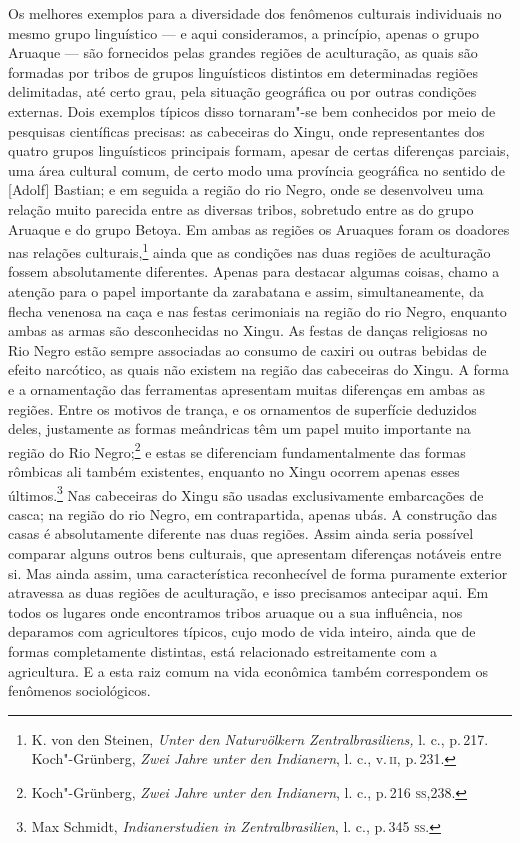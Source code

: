 Os melhores exemplos para a diversidade dos fenômenos culturais
individuais no mesmo grupo linguístico --- e aqui consideramos, a
princípio, apenas o grupo Aruaque --- são fornecidos pelas grandes
regiões de aculturação, as quais são formadas por tribos de grupos
linguísticos distintos em determinadas regiões delimitadas, até certo
grau, pela situação geográfica ou por outras condições externas. Dois
exemplos típicos disso tornaram"-se bem conhecidos por meio de pesquisas
científicas precisas: as cabeceiras do Xingu, onde representantes dos
quatro grupos linguísticos principais formam, apesar de certas
diferenças parciais, uma área cultural comum, de certo modo uma
província geográfica no sentido de {[}Adolf{]} Bastian; e em seguida a
região do rio Negro, onde se desenvolveu uma relação muito parecida
entre as diversas tribos, sobretudo entre as do grupo Aruaque e do grupo
Betoya. Em ambas as regiões os Aruaques foram os doadores nas relações
culturais,\footnote{K. von den Steinen, \textit{Unter den Naturvölkern
  Zentralbrasiliens,} l. c., p.\,217. Koch"-Grünberg, \textit{Zwei Jahre
  unter den Indianern}, l. c., v.\,\textsc{ii}, p.\,231.} ainda que as condições
nas duas regiões de aculturação fossem absolutamente diferentes.
Apenas para destacar algumas coisas, chamo a atenção para o papel
importante da zarabatana e assim, simultaneamente, da flecha venenosa na
caça e nas festas cerimoniais na região do rio Negro, enquanto ambas as
armas são desconhecidas no Xingu. As festas de danças religiosas no Rio
Negro estão sempre associadas ao consumo de caxiri ou outras bebidas de
efeito narcótico, as quais não existem na região das cabeceiras do
Xingu. A forma e a ornamentação das ferramentas apresentam muitas
diferenças em ambas as regiões. Entre os motivos de trança, e os
ornamentos de superfície deduzidos deles, justamente as formas
meândricas têm um papel muito importante na região do Rio
Negro;\footnote{Koch"-Grünberg, \textit{Zwei Jahre unter den Indianern}, l.
  c., p.\,216 \textsc{ss},238.} e estas se diferenciam fundamentalmente das
formas rômbicas ali também existentes, enquanto no Xingu ocorrem apenas
esses últimos.\footnote{Max Schmidt, \textit{Indianerstudien in
  Zentralbrasilien}, l. c., p.\,345 \textsc{ss}.} Nas cabeceiras do Xingu são
usadas exclusivamente embarcações de casca; na região do rio Negro, em
contrapartida, apenas ubás. A construção das casas é absolutamente
diferente nas duas regiões. Assim ainda seria possível comparar alguns
outros bens culturais, que apresentam diferenças notáveis entre si. Mas
ainda assim, uma característica reconhecível de forma puramente exterior
atravessa as duas regiões de aculturação, e isso precisamos antecipar
aqui. Em todos os lugares onde encontramos tribos aruaque ou a sua
influência, nos deparamos com agricultores típicos, cujo modo de vida
inteiro, ainda que de formas completamente distintas, está relacionado
estreitamente com a agricultura. E a esta raiz comum na vida econômica
também correspondem os fenômenos sociológicos.

